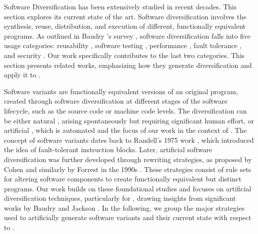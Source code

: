

\label{sota:sw}

Software Diversification has been extensively studied in recent decades. 
This section explores its current state of the art. 
Software diversification involves the synthesis, reuse, distribution, and execution of different, functionally equivalent programs. 
As outlined in Baudry \etal's survey \cite{natural_diversity}, software diversification falls into five usage categories: reusability \cite{pohl2005software}, software testing \cite{Chen2010AdaptiveRT}, performance \cite{10.1145/2025113.2025133}, fault tolerance \cite{1659219}, and security \cite{cohen1993operating}. 
Our work specifically contributes to the last two categories.
This section presents related works, emphasizing how they generate diversification and apply it to \Wasm.






Software variants are functionally equivalent versions of an original program, created through software diversification at different stages of the software lifecycle, such as the source code or machine code levels. 
The diversification can be either natural \cite{natural_diversity}, arising spontaneously but requiring significant human effort, or artificial \cite{offensive_div}, which is automated and the focus of our work in the context of \Wasm.
The concept of software variants dates back to Randell's 1975 work \cite{10.1145/390016.808467}, which introduced the idea of fault-tolerant instruction blocks. Later, artificial software diversification was further developed through rewriting strategies, as proposed by Cohen and similarly by Forrest in the 1990s \cite{cohen1993operating, 595185}. 
These strategies consist of rule sets for altering software components to create functionally equivalent but distinct programs. 
Our work builds on these foundational studies and focuses on artificial diversification techniques, particularly for \Wasm, drawing insights from significant works by Baudry \etal \cite{natural_diversity} and Jackson \etal \cite{jackson}.
In the following, we group the major strategies used to artificially generate software variants and their current state with respect to \Wasm.


